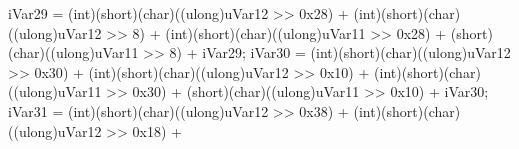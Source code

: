 \documentclass[
]{article}
\newenvironment{Shaded}{}{}
\newcommand{\BaseNTok}[1]{\textcolor[rgb]{0.25,0.63,0.44}{#1}}
\newcommand{\DataTypeTok}[1]{\textcolor[rgb]{0.56,0.13,0.00}{#1}}
\newcommand{\DecValTok}[1]{\textcolor[rgb]{0.25,0.63,0.44}{#1}}
\newcommand{\ExtensionTok}[1]{#1}
\newcommand{\NormalTok}[1]{#1}
\newcommand{\OperatorTok}[1]{\textcolor[rgb]{0.40,0.40,0.40}{#1}}
\begin{document}
\begin{Shaded}
\begin{Highlighting}[]
\NormalTok{        iVar29 }\OperatorTok{=} \OperatorTok{(}\DataTypeTok{int}\OperatorTok{)(}\DataTypeTok{short}\OperatorTok{)(}\DataTypeTok{char}\OperatorTok{)((}\ExtensionTok{ulong}\OperatorTok{)}\NormalTok{uVar12 }\OperatorTok{\textgreater{}\textgreater{}} \BaseNTok{0x28}\OperatorTok{)} \OperatorTok{+}
                 \OperatorTok{(}\DataTypeTok{int}\OperatorTok{)(}\DataTypeTok{short}\OperatorTok{)(}\DataTypeTok{char}\OperatorTok{)((}\ExtensionTok{ulong}\OperatorTok{)}\NormalTok{uVar12 }\OperatorTok{\textgreater{}\textgreater{}} \DecValTok{8}\OperatorTok{)} \OperatorTok{+}
                 \OperatorTok{(}\DataTypeTok{int}\OperatorTok{)(}\DataTypeTok{short}\OperatorTok{)(}\DataTypeTok{char}\OperatorTok{)((}\ExtensionTok{ulong}\OperatorTok{)}\NormalTok{uVar11 }\OperatorTok{\textgreater{}\textgreater{}} \BaseNTok{0x28}\OperatorTok{)} \OperatorTok{+}
                 \OperatorTok{(}\DataTypeTok{short}\OperatorTok{)(}\DataTypeTok{char}\OperatorTok{)((}\ExtensionTok{ulong}\OperatorTok{)}\NormalTok{uVar11 }\OperatorTok{\textgreater{}\textgreater{}} \DecValTok{8}\OperatorTok{)} \OperatorTok{+}\NormalTok{ iVar29}\OperatorTok{;}
\NormalTok{        iVar30 }\OperatorTok{=} \OperatorTok{(}\DataTypeTok{int}\OperatorTok{)(}\DataTypeTok{short}\OperatorTok{)(}\DataTypeTok{char}\OperatorTok{)((}\ExtensionTok{ulong}\OperatorTok{)}\NormalTok{uVar12 }\OperatorTok{\textgreater{}\textgreater{}} \BaseNTok{0x30}\OperatorTok{)} \OperatorTok{+}
                 \OperatorTok{(}\DataTypeTok{int}\OperatorTok{)(}\DataTypeTok{short}\OperatorTok{)(}\DataTypeTok{char}\OperatorTok{)((}\ExtensionTok{ulong}\OperatorTok{)}\NormalTok{uVar12 }\OperatorTok{\textgreater{}\textgreater{}} \BaseNTok{0x10}\OperatorTok{)} \OperatorTok{+}
                 \OperatorTok{(}\DataTypeTok{int}\OperatorTok{)(}\DataTypeTok{short}\OperatorTok{)(}\DataTypeTok{char}\OperatorTok{)((}\ExtensionTok{ulong}\OperatorTok{)}\NormalTok{uVar11 }\OperatorTok{\textgreater{}\textgreater{}} \BaseNTok{0x30}\OperatorTok{)} \OperatorTok{+}
                 \OperatorTok{(}\DataTypeTok{short}\OperatorTok{)(}\DataTypeTok{char}\OperatorTok{)((}\ExtensionTok{ulong}\OperatorTok{)}\NormalTok{uVar11 }\OperatorTok{\textgreater{}\textgreater{}} \BaseNTok{0x10}\OperatorTok{)} \OperatorTok{+}\NormalTok{ iVar30}\OperatorTok{;}
\NormalTok{        iVar31 }\OperatorTok{=} \OperatorTok{(}\DataTypeTok{int}\OperatorTok{)(}\DataTypeTok{short}\OperatorTok{)(}\DataTypeTok{char}\OperatorTok{)((}\ExtensionTok{ulong}\OperatorTok{)}\NormalTok{uVar12 }\OperatorTok{\textgreater{}\textgreater{}} \BaseNTok{0x38}\OperatorTok{)} \OperatorTok{+}
                 \OperatorTok{(}\DataTypeTok{int}\OperatorTok{)(}\DataTypeTok{short}\OperatorTok{)(}\DataTypeTok{char}\OperatorTok{)((}\ExtensionTok{ulong}\OperatorTok{)}\NormalTok{uVar12 }\OperatorTok{\textgreater{}\textgreater{}} \BaseNTok{0x18}\OperatorTok{)} \OperatorTok{+}

\end{Highlighting}
\end{Shaded}
\end{document}
